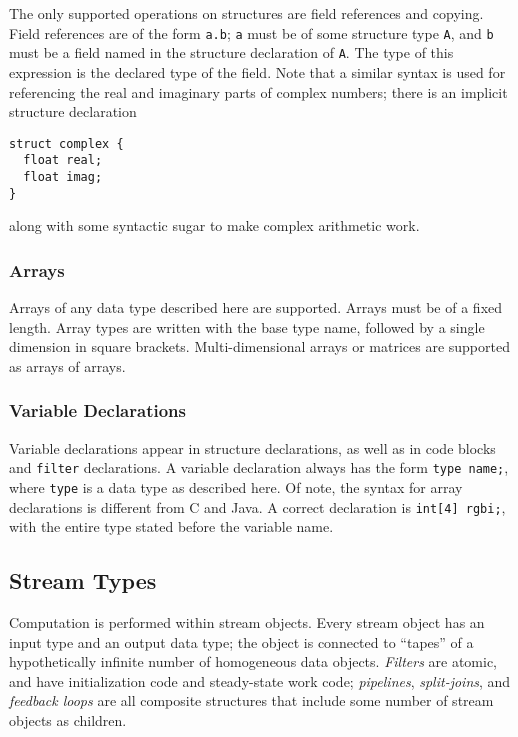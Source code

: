 \documentclass[11pt]{article}
\begin{document}
The only supported operations on structures are field references and
copying.  Field references are of the form \texttt{a.b}; \texttt{a} must
be of some structure type \texttt{A}, and \texttt{b} must be a field named
in the structure declaration of \texttt{A}.  The type of this expression
is the declared type of the field.  Note that a similar syntax is used
for referencing the real and imaginary parts of complex numbers; there
is an implicit structure declaration

\begin{verbatim}
struct complex {
  float real;
  float imag;
}
\end{verbatim}

\noindent
along with some syntactic sugar to make complex arithmetic work.

\subsubsection{Arrays}

Arrays of any data type described here are supported.  Arrays must be
of a fixed length.  Array types are written with the base type name,
followed by a single dimension in square brackets.  Multi-dimensional
arrays or matrices are supported as arrays of arrays.

\subsubsection{Variable Declarations}

Variable declarations appear in structure declarations, as well as in
code blocks and \texttt{filter} declarations.  A variable declaration
always has the form \texttt{type name;}, where \texttt{type} is a data
type as described here.  Of note, the syntax for array declarations is
different from C and Java.  A correct declaration is
\texttt{int[4] rgbi;}, with the entire type stated before the variable name.


\subsection{Stream Types}

Computation is performed within stream objects.  Every stream object
has an input type and an output data type; the object is connected to
``tapes'' of a hypothetically infinite number of homogeneous data
objects.  \emph{Filters} are atomic, and have initialization code and
steady-state work code; \emph{pipelines}, \emph{split-joins}, and
\emph{feedback loops} are all composite structures that include some
number of stream objects as children.
\end{document}
